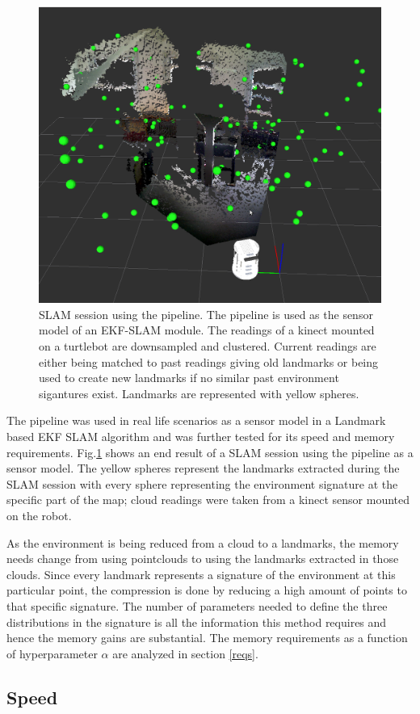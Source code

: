 \documentclass[twoside,hidelinks]{article}
\begin{document}
\begin{figure}
  \centering
    \includegraphics[width=.5\textwidth]{SLAM110landmarks2}
    \caption{SLAM session using the pipeline. The pipeline is used as the sensor model of an EKF-SLAM module. The readings of a kinect mounted on a turtlebot are downsampled and clustered. Current readings are either being matched to past readings giving old landmarks or being used to create new landmarks if no similar past environment sigantures exist. Landmarks are represented with yellow spheres. }
  \label{SLAM}
\end{figure}


The pipeline was used in real life scenarios as a sensor model in a Landmark based EKF SLAM algorithm and was further tested for its speed and memory requirements. Fig.\ref{SLAM} shows an end result of a SLAM session using the pipeline as a sensor model. The yellow spheres represent the landmarks extracted during the SLAM session with every sphere representing the environment signature at the specific part of the map; cloud readings were taken from a kinect sensor mounted on the robot.


As the environment is being reduced from a cloud to a landmarks, the memory needs change from using pointclouds to using the landmarks extracted in those clouds. Since every landmark represents a signature of the environment at this particular point, the compression is done by reducing a high amount of points to that specific signature. The number of parameters needed to define the three distributions in the signature is all the information this method requires and hence the memory gains are substantial. The memory requirements as a function of hyperparameter $\alpha$ are analyzed in section \ref{reqs}. 

\subsection{Speed}
\end{document}

